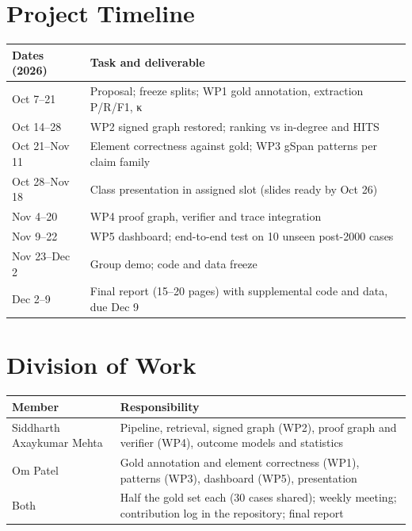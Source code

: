 \documentclass[12pt,a4paper]{article}
\newcommand{\hdr}{\rowcolor{band}}
\begin{document}
\section{Project Timeline}
\begin{tabularx}{\textwidth}{@{}P{3.2cm}Y@{}}
\toprule
\hdr \textbf{Dates (2026)} & \textbf{Task and deliverable} \\
\midrule
Oct 7--21 & Proposal; freeze splits; WP1 gold annotation, extraction P/R/F1, κ \\
Oct 14--28 & WP2 signed graph restored; ranking vs in-degree and HITS \\
Oct 21--Nov 11 & Element correctness against gold; WP3 gSpan patterns per claim family \\
Oct 28--Nov 18 & Class presentation in assigned slot (slides ready by Oct 26) \\
Nov 4--20 & WP4 proof graph, verifier and trace integration \\
Nov 9--22 & WP5 dashboard; end-to-end test on 10 unseen post-2000 cases \\
Nov 23--Dec 2 & Group demo; code and data freeze \\
Dec 2--9 & Final report (15--20 pages) with supplemental code and data, due Dec 9 \\
\bottomrule
\end{tabularx}

\section{Division of Work}
\begin{tabularx}{\textwidth}{@{}P{4.6cm}Y@{}}
\toprule
\hdr \textbf{Member} & \textbf{Responsibility} \\
\midrule
Siddharth Axaykumar Mehta & Pipeline, retrieval, signed graph (WP2), proof graph and verifier (WP4), outcome models and statistics \\
Om Patel & Gold annotation and element correctness (WP1), patterns (WP3), dashboard (WP5), presentation \\
Both & Half the gold set each (30 cases shared); weekly meeting; contribution log in the repository; final report \\
\bottomrule
\end{tabularx}
\end{document}
